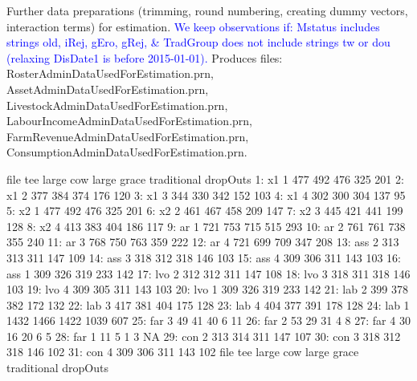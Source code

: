 Further data preparations (trimming, round numbering, creating dummy vectors, interaction terms) for estimation. \textcolor{blue}{We keep observations if: \textsf{Mstatus} includes strings old, iRej, gEro, gRej, \& \textsf{TradGroup} does not include strings tw or dou (relaxing  \textsf{DisDate1} is before 2015-01-01). } Produces files: \textsf{\footnotesize RosterAdminDataUsedForEstimation.prn, AssetAdminDataUsedForEstimation.prn, LivestockAdminDataUsedForEstimation.prn, LabourIncomeAdminDataUsedForEstimation.prn, FarmRevenueAdminDataUsedForEstimation.prn, ConsumptionAdminDataUsedForEstimation.prn}.
\begin{Schunk}
\begin{Soutput}
    file tee large  cow large grace traditional dropOuts
 1:   x1   1   477  492         476         325      201
 2:   x1   2   377  384         374         176      120
 3:   x1   3   344  330         342         152      103
 4:   x1   4   302  300         304         137       95
 5:   x2   1   477  492         476         325      201
 6:   x2   2   461  467         458         209      147
 7:   x2   3   445  421         441         199      128
 8:   x2   4   413  383         404         186      117
 9:   ar   1   721  753         715         515      293
10:   ar   2   761  761         738         355      240
11:   ar   3   768  750         763         359      222
12:   ar   4   721  699         709         347      208
13:  ass   2   313  313         311         147      109
14:  ass   3   318  312         318         146      103
15:  ass   4   309  306         311         143      103
16:  ass   1   309  326         319         233      142
17:  lvo   2   312  312         311         147      108
18:  lvo   3   318  311         318         146      103
19:  lvo   4   309  305         311         143      103
20:  lvo   1   309  326         319         233      142
21:  lab   2   399  378         382         172      132
22:  lab   3   417  381         404         175      128
23:  lab   4   404  377         391         178      128
24:  lab   1  1432 1466        1422        1039      607
25:  far   3    49   41          40           6       11
26:  far   2    53   29          31           4        8
27:  far   4    30   16          20           6        5
28:  far   1    11    5           1           3       NA
29:  con   2   313  314         311         147      107
30:  con   3   318  312         318         146      102
31:  con   4   309  306         311         143      102
    file tee large  cow large grace traditional dropOuts
\end{Soutput}
\end{Schunk}

